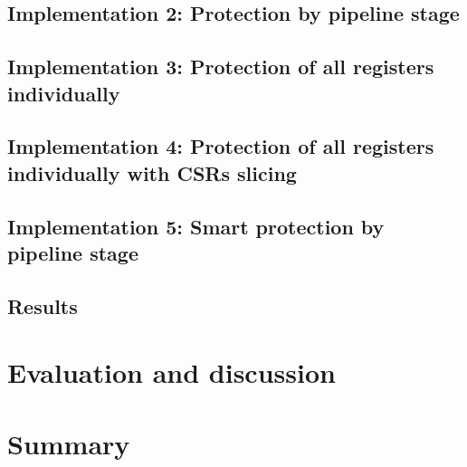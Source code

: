 \subsection{Implementation 2: Protection by pipeline stage}

\subsection{Implementation 3: Protection of all registers individually}

\subsection{Implementation 4: Protection of all registers individually with CSRs slicing}

\subsection{Implementation 5: Smart protection by pipeline stage}

\subsection{Results}


\section{Evaluation and discussion}
\label{section:chap6_discussion}


\section{Summary}


